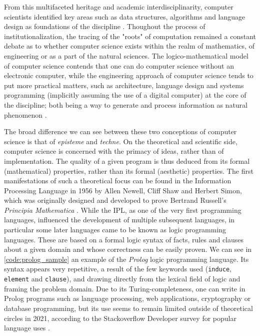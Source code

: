 From this multifaceted heritage and academic interdisciplinarity, computer scientists identified key areas such as data structures, algorithms and language design as foundations of the discipline \citep{wirth_algorithms_1976}. Thoughout the process of institutionalization, the tracing of the "roots" of computation remained a constant debate as to whether computer science exists within the realm of mathematics, of engineering or as a part of the natural sciences. The logico-mathematical model of computer science contends that one can do computer science without an electronic computer, while the engineering approach of computer science tends to put more practical matters, such as architecture, language design and systems programming (implicitly assuming the use of a digital computer) at the core of the discipline; both being a way to generate and process information as natural phenomenon \citep{tedre_development_2006}.

The broad difference we can see between these two conceptions of computer science is that of \emph{episteme} and \emph{techne}. On the theoretical and scientific side, computer science is concerned with the primacy of ideas, rather than of implementation. The quality of a given program is thus deduced from its formal (mathematical) properties, rather than its formal (aesthetic) properties. The first manifestations of such a theoretical focus can be found in the Information Processing Language in 1956 by Allen Newell, Cliff Shaw and Herbert Simon, which was originally designed and developed to prove Bertrand Russell's \emph{Principia Mathematica} \citep{ifrah_universal_2001}. While the IPL, as one of the very first programming languages, influenced the development of multiple subsequent languages, in particular some later languages came to be known as logic programming languages. These are based on a formal logic syntax of facts, rules and clauses about a given domain and whose correctness can be easily proven. We can see in \ref{code:prolog_sample} an example of the \emph{Prolog} logic programming language. Its syntax appears very repetitive, a result of the few keywords used (\lstinline{induce}, \lstinline{element} and \lstinline{clause}), and drawing directly from the lexical field of logic and framing the problem domain. Due to its Turing-completeness, one can write in Prolog programs such as language processing, web applications, cryptography or database programming, but its use seems to remain limited outside of theoretical circles in 2021, according to the Stackoverflow Developer survey for popular language uses \citep{stackoverflow_stack_2021}.

